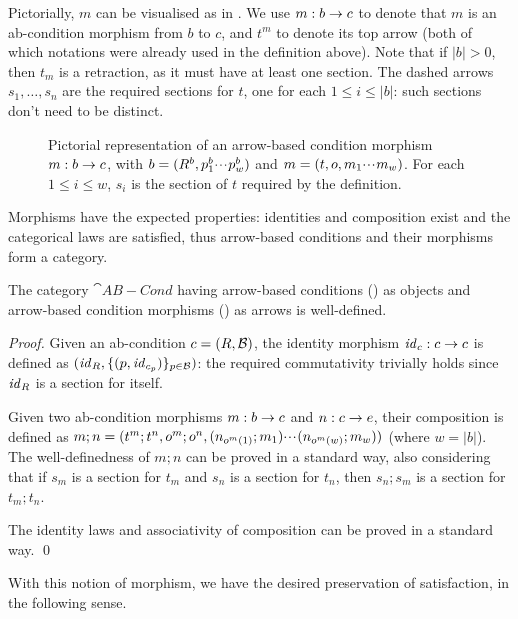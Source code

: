 Pictorially, $m$ can be visualised as in . We use $m:b\rightarrow c$ to denote that $m$ is an ab-condition morphism from $b$ to $c$, and $t^m$ to denote its top arrow (both of which notations were already used in the definition above). Note that if $|b|>0$, then $t_m$ is a retraction, as it must have at least one section.  The dashed arrows $s_1, \ldots, s_n$ are the required sections for $t$, one for each $1\leq i\leq |b|$: such sections don't need to be distinct.  

%
\begin{figure}
  \centering
  
  \caption{Pictorial representation of an arrow-based condition morphism $m:b\rightarrow c$, with $b=(R^b,p^b_1{\cdotp\mkern-2mu\cdotp\mkern-2mu\cdotp\mkern1mu} p^b_w)$ and $m = (t,o,m_1{\cdotp\mkern-2mu\cdotp\mkern-2mu\cdotp\mkern1mu} m_w)$. For each $1 \leq i \leq w$, $s_i$ is the section of $t$ required by the definition.}
\end{figure}

\medskip\noindent Morphisms have the expected properties: identities and composition exist and the categorical laws are satisfied, thus arrow-based conditions and their morphisms form a category.
%

\begin{proposition}
  The category $\cat{AB-Cond}$ having arrow-based conditions () as objects and arrow-based condition morphisms () as arrows is well-defined.
\end{proposition}
 
\begin{proof}
  Given an ab-condition $c=(R,\mathcal{B})$, the identity morphism $\mathit{id}_c:c\rightarrow c$ is defined as $(\mathit{id}_R,\{{(p,\mathit{id}_{c_p})}\}_{p\in \mathcal{B}})$: the required commutativity trivially holds since $\mathit{id}_R$ is a section for itself.
  
Given two ab-condition morphisms $m:b\rightarrow c$ and $n:c\rightarrow e$, their composition is defined as $m;n=(t^m;t^n,o^m;o^n,(n_{o^m(1)};m_1){\cdotp\mkern-2mu\cdotp\mkern-2mu\cdotp\mkern1mu} (n_{o^m(w)};m_{w}))$ (where $w=|b|$). The well-definedness of $m;n$ can be proved in a standard way, also considering that if $s_m$ is a section for $t_m$ and $s_n$ is a section for $t_n$, then $s_n;s_m$ is a section for $t_m;t_n$.

The identity laws and associativity of composition can be proved in a standard way. \qed
\end{proof}
%
With this notion of morphism, we have the desired preservation of satisfaction, in the following sense.

